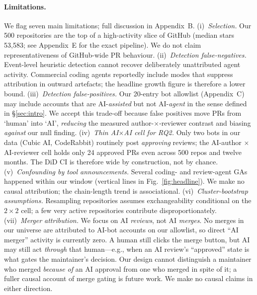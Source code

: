 \documentclass{article}
\begin{document}
\paragraph{Limitations.} We flag seven main limitations; full discussion in Appendix~B.
(i)~\emph{Selection.} Our 500 repositories are the top of a high-activity slice of GitHub (median stars 53{,}583; see Appendix~E for the exact pipeline). We do not claim representativeness of GitHub-wide PR behaviour.
(ii)~\emph{Detection false-negatives.} Event-level heuristic detection cannot recover deliberately unattributed agent activity. Commercial coding agents reportedly include modes that suppress attribution in outward artefacts; the headline growth figure is therefore a lower bound.
(iii)~\emph{Detection false-positives.} Our 20-entry bot allowlist (Appendix~C) may include accounts that are AI-\emph{assisted} but not AI-\emph{agent} in the sense defined in §\ref{sec:intro}. We accept this trade-off because false positives move PRs from `human' into `AI', \emph{reducing} the measured author-$\times$-reviewer contrast and biasing \emph{against} our null finding.
(iv)~\emph{Thin AI$\times$AI cell for RQ2.} Only two bots in our data (Cubic AI, CodeRabbit) routinely post \emph{approving} reviews; the AI-author $\times$ AI-reviewer cell holds only 24{} approved PRs even across 500 repos and twelve months. The DiD CI is therefore wide by construction, not by chance.
(v)~\emph{Confounding by tool announcements.} Several coding- and review-agent GAs happened within our window (vertical lines in Fig.~\ref{fig:headline}). We make no causal attribution; the chain-length trend is associational.
(vi)~\emph{Cluster-bootstrap assumptions.} Resampling repositories assumes exchangeability conditional on the $2\times 2$ cell; a few very active repositories contribute disproportionately.
(vii)~\emph{Merger attribution.} We focus on AI \emph{reviews}, not AI \emph{merges}. No merges in our universe are attributed to AI-bot accounts on our allowlist, so direct ``AI merger'' activity is currently zero. A human still clicks the merge button, but AI may still act \emph{through} that human---e.g., when an AI review's ``approved'' state is what gates the maintainer's decision. Our design cannot distinguish a maintainer who merged \emph{because of} an AI approval from one who merged in spite of it; a fuller causal account of merge gating is future work.
We make no causal claims in either direction.



\end{document}
